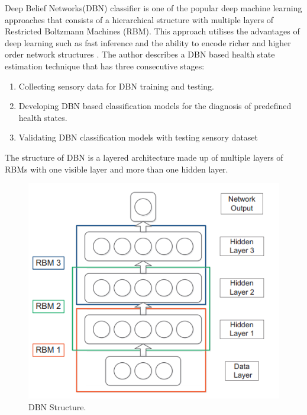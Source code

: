Deep Belief Networks(DBN) classifier is one of the popular deep machine learning approaches that consists of a hierarchical structure with multiple layers of Restricted Boltzmann Machines (RBM). This approach utilises the advantages of deep learning such as fast inference and the ability to encode richer and higher order network structures \cite{DBLP:journals/ress/TamilselvanW13}. The author describes a DBN based health state estimation technique that has three consecutive stages:
\begin{enumerate}
    \item Collecting sensory data for DBN training and testing.\vspace*{-3mm}
    \item Developing DBN based classification models for the diagnosis of predefined health states.\vspace*{-3mm}
    \item Validating DBN classification models with testing sensory dataset\vspace*{-3mm}
\end{enumerate}
The structure of DBN is a layered architecture made up of multiple layers of RBMs with one visible layer and more than one hidden layer. 
\begin{figure}[ht]
	\centering
	\includegraphics[scale=0.8]{gfx/dbn1.png}
    \captionsetup{justification=centering}
	\caption{DBN Structure.\cite{DBLP:journals/ress/TamilselvanW13}}
	\label{fig:DBN structure}
\end{figure}

